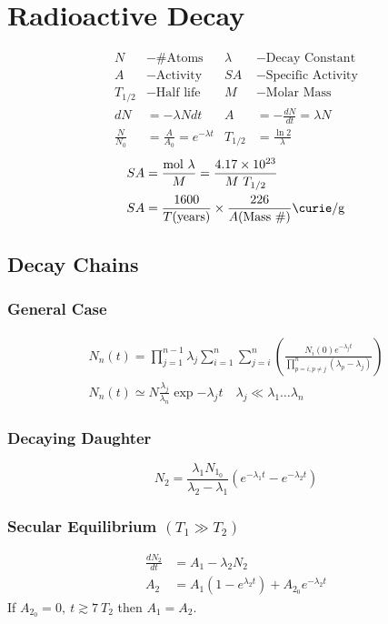 \section{Radioactive Decay}
\begin{align*}
N &- \text{\# Atoms} & \lambda &- \text{Decay Constant} \\
A &- \text{Activity} & SA &- \text{Specific Activity} \\
T_{1 / 2} &- \text{Half life} & M &- \text{Molar Mass}\\
dN &= -\lambda N dt & A &= -\frac{dN}{dt} = \lambda N\\
\frac{N}{N_0} &= \frac{A}{A_0} = e^{-\lambda t} & T_{1 / 2} &= \frac{\ln{2}}{\lambda}
\end{align*} 
\begin{align*}
SA &= \frac{\si{\mole} ~ \lambda}{M} = \frac{\SI{4.17e23}{}}{M~T_{1 / 2}} \\
SA &= \frac{1600}{T (\text{years})} \times \frac{226}{A (\text{Mass \#})} \SI{}{\curie\per\gram}
\end{align*}

\subsection{Decay Chains}
\subsubsection{General Case}
\begin{gather*}
N_n(t) = \prod_{j=1}^{n-1} \lambda_j \sum_{i=1}^n \sum_{j=i}^n 
\left ( \frac{N_i(0)e^{-\lambda_j t}}{\prod_{p=i, p\neq j}^n (\lambda_p-\lambda_j)} \right ) \\
N_n(t) \simeq N \frac{\lambda_j}{\lambda_n} \exp{-\lambda_j t} \quad \lambda_j \ll \lambda_1 \ldots \lambda_n
\end{gather*}

\subsubsection{Decaying Daughter}
\[N_2 = \frac{\lambda_1 N_{1_0}}{\lambda_2 - \lambda_1} \left( e^{-\lambda_1 t} - e^{-\lambda_2 t} \right) \]

\subsubsection{Secular Equilibrium $(T_1 \gg T_2)$}
\begin{align*}
\frac{dN_2}{dt} &= A_1 - \lambda_2 N_2 \\
A_2 &= A_1 \left( 1 - e^{\lambda_2 t} \right) + A_{2_0} e^{-\lambda_2 t}
\end{align*}
If $A_{2_0} = 0,~t \gtrsim 7~T_2$ then $A_1 = A_2$.

